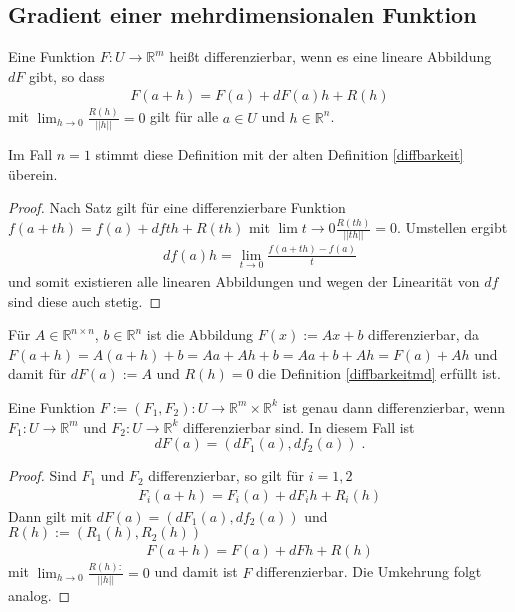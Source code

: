 \subsection{Gradient einer  mehrdimensionalen Funktion}
\begin{Definition}
\label{diffbarkeitmd}
Eine Funktion $F: U \to \mathbb{R}^m$ heißt differenzierbar, wenn es eine lineare Abbildung $dF$ gibt, so dass 
\begin{align*}
F(a + h) = F(a) + dF(a)h + R(h)
\end{align*}
mit $\lim_{h \to 0} \frac{R(h)}{||h||} = 0$ gilt für alle $a \in U$ und $h \in \mathbb{R}^n$.
\end{Definition}

\begin{Bemerkung}
Im Fall $n = 1$ stimmt diese Definition mit der alten Definition \ref{diffbarkeit} überein.
\end{Bemerkung}
\begin{proof}
Nach Satz \label{lokaleLinearisierung} gilt für eine differenzierbare Funktion $f(a + th) = f(a) + df th + R(th)$ mit  $\lim{t \to 0} \frac{R(th)}{||th||} = 0$. Umstellen ergibt
\begin{align*}
df(a) h = \lim_{t \to 0} \frac{f(a + th) - f(a)}{t}
\end{align*} 
und somit existieren alle linearen Abbildungen und wegen der Linearität von $df$ sind diese auch stetig.
\end{proof}

\begin{Beispiel}
Für $A \in \mathbb{R}^{n \times n}$, $b \in \mathbb{R}^n$  ist die Abbildung $F(x) := Ax +b$ differenzierbar, da
$F(a +h) = A(a+h) + b = A a+ Ah +b = Aa +b + Ah = F(a) + Ah$ und damit für $dF(a) := A$ und $R(h) = 0$ die Definition \ref{diffbarkeitmd}
 erfüllt ist.
\end{Beispiel}

\begin{Satz}
Eine Funktion $F:= (F_1, F_2) : U  \to \mathbb{R}^m \times \mathbb{R}^k$ ist genau dann differenzierbar, 
wenn $F_1 : U  \to \mathbb{R}^m$ und   $F_2 : U  \to \mathbb{R}^k$ differenzierbar sind. In diesem Fall ist
$$dF(a) = (dF_1(a), df_2 (a)) \;.$$ 
\end{Satz}
\begin{proof}
Sind $F_1$ und $F_2$ differenzierbar, so gilt für $i = 1,2$
\begin{align*}
F_i (a + h) = F_i(a) + dF_ih + R_i(h)
\end{align*}
Dann gilt mit $dF(a) = (dF_1(a), df_2 (a))$ und $R(h):= (R_1(h), R_2(h))$
\begin{align*}
F (a + h) = F (a) + dF h + R(h)
\end{align*}
mit $\lim_{h \to 0} \frac{R(h):}{||h||} = 0$ und damit ist $F$ differenzierbar. Die Umkehrung folgt analog.
\end{proof}

